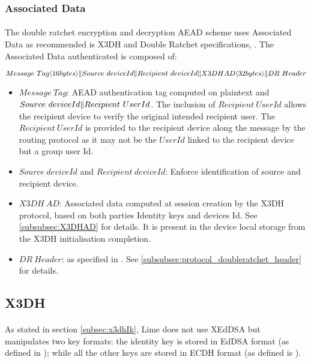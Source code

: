 \documentclass[a4paper,11pt]{article}
\begin{document}
    \subsubsection{Associated Data}
     \label{subsubsec:associatedData}
     \paragraph{}The double ratchet encryption and decryption AEAD scheme uses Associated Data as recommended is X3DH and Double Ratchet specifications\cite[section 3.3]{x3dh}, \cite[section 3.4]{doubleRatchet}. The Associated Data authenticated is composed of:
     \begin{algorithmic}
          \State $Message\ Tag\langle 16bytes\rangle \Arrowvert Source\ deviceId \Arrowvert Recipient\ deviceId \Arrowvert X3DH AD\langle 32bytes\rangle \Arrowvert DR\ Header$
     \end{algorithmic}
     \begin{itemize}
      \item $Message\ Tag$: AEAD authentication tag computed on plaintext and $Source\ deviceId \Arrowvert Recipient\ UserId$. The inclusion of $Recipient\ UserId$ allows the recipient device to verify the original intended recipient user. The $Recipient\ UserId$ is provided to the recipient device along the message by the routing protocol as it may not be the $UserId$ linked to the recipient device but a group user Id.
      \item $Source\ deviceId$ and $Recipient\ deviceId$: Enforce identification of source and recipient device.
      \item $X3DH\ AD$: Associated data computed at session creation by the X3DH protocol, based on both parties Identity keys and devices Id. See \ref{subsubsec:X3DHAD} for details. It is present in the device local storage from the X3DH initialisation completion.
      \item $DR\ Header$: as specified in \cite[section 3.4]{doubleRatchet}. See \ref{subsubsec:protocol_doubleratchet_header} for details.
     \end{itemize}


  \subsection{X3DH}
    \paragraph*{}As stated in section \ref{subsec:x3dhIk}, Lime does not use XEdDSA but manipulates two key formats: the identity key is stored in EdDSA format (as defined in \cite{rfc8032}); while all the other keys are stored in ECDH format (as defined is \cite{rfc7748}).
\end{document}
